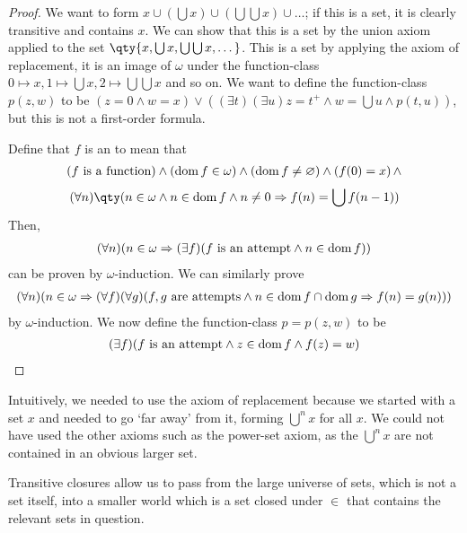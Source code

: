 \begin{proof}
    We want to form $x \cup (\bigcup x) \cup (\bigcup\bigcup x) \cup \dots$; if this is a set, it is clearly transitive and contains $x$.
    We can show that this is a set by the union axiom applied to the set $\qty{x, \bigcup x, \bigcup\bigcup x, \dots}$.
    This is a set by applying the axiom of replacement, it is an image of $\omega$ under the function-class $0 \mapsto x, 1 \mapsto \bigcup x, 2 \mapsto \bigcup \bigcup x$ and so on.
    We want to define the function-class $p(z,w)$ to be $(z = 0 \wedge w = x) \vee ((\exists t)(\exists u) z = t^+ \wedge w = \bigcup u \wedge p(t,u))$, but this is not a first-order formula.

    Define that $f$ is an  to mean that
    \begin{align*}
        (f \text{ is a function}) \wedge (\operatorname{dom} f \in \omega) \wedge (\operatorname{dom} f \neq \varnothing) \wedge (f(0) = x)\, \wedge
    \end{align*}
    \begin{align*}
        (\forall n)\qty(n \in \omega \wedge n \in \dom f \wedge n \neq 0 \Rightarrow f(n) = \bigcup f(n-1))
    \end{align*}
    Then,
    \begin{align*}
        (\forall n)(n \in \omega \Rightarrow (\exists f)(f \text{ is an attempt} \wedge n \in \operatorname{dom} f))
    \end{align*}
    can be proven by $\omega$-induction.
    We can similarly prove
    \begin{align*}
        (\forall n)(n \in \omega \Rightarrow (\forall f)(\forall g)(f, g \text{ are attempts} \wedge n \in \operatorname{dom} f \cap \operatorname{dom} g \Rightarrow f(n) = g(n)))
    \end{align*}
    by $\omega$-induction.
    We now define the function-class $p = p(z,w)$ to be
    \begin{align*}
        (\exists f)(f \text{ is an attempt} \wedge z \in \operatorname{dom} f \wedge f(z) = w)
    \end{align*}
\end{proof}
Intuitively, we needed to use the axiom of replacement because we started with a set $x$ and needed to go `far away' from it, forming $\bigcup^n x$ for all $x$.
We could not have used the other axioms such as the power-set axiom, as the $\bigcup^n x$ are not contained in an obvious larger set.

Transitive closures allow us to pass from the large universe of sets, which is not a set itself, into a smaller world which is a set closed under $\in$ that contains the relevant sets in question.

